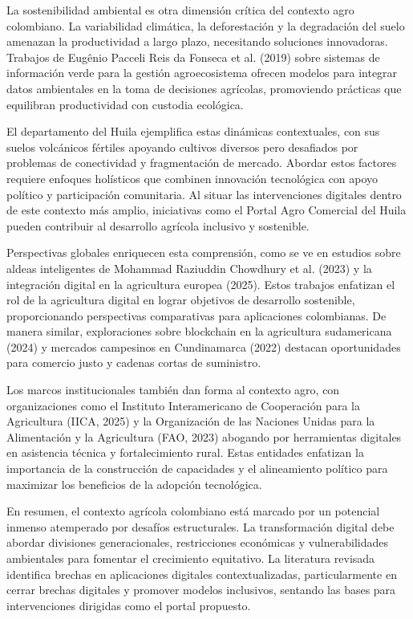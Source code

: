 La sostenibilidad ambiental es otra dimensión crítica del contexto agro colombiano. La variabilidad climática, la deforestación y la degradación del suelo amenazan la productividad a largo plazo, necesitando soluciones innovadoras. Trabajos de Eugênio Pacceli Reis da Fonseca et al. (2019) sobre sistemas de información verde para la gestión agroecosistema ofrecen modelos para integrar datos ambientales en la toma de decisiones agrícolas, promoviendo prácticas que equilibran productividad con custodia ecológica.

El departamento del Huila ejemplifica estas dinámicas contextuales, con sus suelos volcánicos fértiles apoyando cultivos diversos pero desafiados por problemas de conectividad y fragmentación de mercado. Abordar estos factores requiere enfoques holísticos que combinen innovación tecnológica con apoyo político y participación comunitaria. Al situar las intervenciones digitales dentro de este contexto más amplio, iniciativas como el Portal Agro Comercial del Huila pueden contribuir al desarrollo agrícola inclusivo y sostenible.

Perspectivas globales enriquecen esta comprensión, como se ve en estudios sobre aldeas inteligentes de Mohammad Raziuddin Chowdhury et al. (2023) y la integración digital en la agricultura europea (2025). Estos trabajos enfatizan el rol de la agricultura digital en lograr objetivos de desarrollo sostenible, proporcionando perspectivas comparativas para aplicaciones colombianas. De manera similar, exploraciones sobre blockchain en la agricultura sudamericana (2024) y mercados campesinos en Cundinamarca (2022) destacan oportunidades para comercio justo y cadenas cortas de suministro.

Los marcos institucionales también dan forma al contexto agro, con organizaciones como el Instituto Interamericano de Cooperación para la Agricultura (IICA, 2025) y la Organización de las Naciones Unidas para la Alimentación y la Agricultura (FAO, 2023) abogando por herramientas digitales en asistencia técnica y fortalecimiento rural. Estas entidades enfatizan la importancia de la construcción de capacidades y el alineamiento político para maximizar los beneficios de la adopción tecnológica.

En resumen, el contexto agrícola colombiano está marcado por un potencial inmenso atemperado por desafíos estructurales. La transformación digital debe abordar divisiones generacionales, restricciones económicas y vulnerabilidades ambientales para fomentar el crecimiento equitativo. La literatura revisada identifica brechas en aplicaciones digitales contextualizadas, particularmente en cerrar brechas digitales y promover modelos inclusivos, sentando las bases para intervenciones dirigidas como el portal propuesto.

